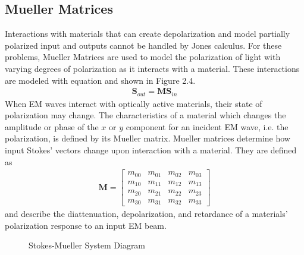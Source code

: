 \subsection{Mueller Matrices}
Interactions with materials that can create depolarization and model partially polarized input and outputs cannot be handled by Jones calculus.  For these problems, Mueller Matrices are used to model the polarization of light with varying degrees of polarization as it interacts with a material.  These interactions are modeled with equation and shown in Figure 2.4.
\begin{align}
    \mathbf{S}_{out} = \mathbf{M}\mathbf{S}_{in}
\end{align}
%
When EM waves interact with optically active materials, their state of polarization may change.  The characteristics of a material which changes the amplitude or phase of the $x$ or $y$ component for an incident EM wave, i.e. the  polarization, is defined by its Mueller matrix.  Mueller matrices determine how input Stokes' vectors change upon interaction with a material. They are defined as
%
\begin{align}
    \mathbf{M} =
    \begin{bmatrix}
        m_{00} & m_{01} & m_{02} & m_{03} \\
        m_{10} & m_{11} & m_{12} & m_{13} \\
        m_{20} & m_{21} & m_{22} & m_{23} \\
        m_{30} & m_{31} & m_{32} & m_{33}
    \end{bmatrix}
\end{align}
%
and describe the diattenuation, depolarization, and retardance of a materials' polarization response to an input EM beam.
\begin{figure}
    \begin{center}
    \end{center}
    \caption{Stokes-Mueller System Diagram}
    \label{fig:polarization}
\end{figure}
